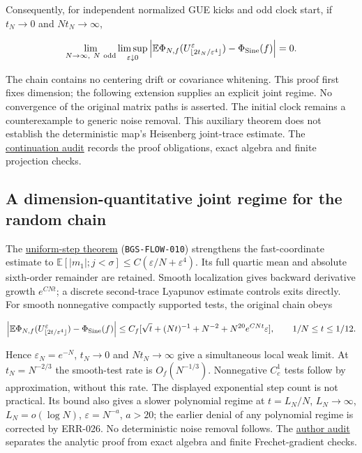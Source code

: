 Consequently, for independent normalized GUE kicks and odd clock start,
if \(t_N\to0\) and \(Nt_N\to\infty\),

\[
\lim_{N\to\infty,\ N\ {\rm odd}}\limsup_{\varepsilon\downarrow0}
\left|\mathbb E\Phi_{N,f}
 (U^\varepsilon_{\lfloor2t_N/\varepsilon^4\rfloor})
-\Phi_{\rm Sine}(f)\right|=0.
\]

The chain contains no centering drift or covariance whitening. This proof
first fixes dimension; the following extension supplies an explicit joint
regime. No convergence of the original matrix paths is asserted. The initial clock remains
a counterexample to generic noise removal. This auxiliary theorem does not
establish the deterministic map's Heisenberg joint-trace estimate. The
\href{https://github.com/ChurilovMaksim/BGS/blob/main/archive/record/coboundary_mobius_review_20260929.md}{continuation audit} records
the proof obligations, exact algebra and finite projection checks.

\hypertarget{a-dimension-quantitative-joint-regime-for-the-random-chain}{%
\subsection{A dimension-quantitative joint regime for the random chain}\label{a-dimension-quantitative-joint-regime-for-the-random-chain}}

The \href{https://github.com/ChurilovMaksim/BGS/blob/main/mathematics/coboundary_joint_limit.md}{uniform-step theorem} (\texttt{BGS-FLOW-010})
strengthens the fast-coordinate estimate to
\(\mathbb E[|m_1|;j<\sigma]\le C(\varepsilon/N+\varepsilon^4)\).
Its full quartic mean and absolute sixth-order remainder are retained.
Smooth localization gives backward derivative growth \(e^{CNt}\);
a discrete second-trace Lyapunov estimate controls exits directly.
For smooth nonnegative compactly supported tests, the original chain obeys

\[
\left|\mathbb E\Phi_{N,f}
 (U^\varepsilon_{\lfloor2t/\varepsilon^4\rfloor})
-\Phi_{\rm Sine}(f)\right|
\le C_f[\sqrt t+(Nt)^{-1}+N^{-2}+N^{20}e^{CNt}\varepsilon],
\qquad 1/N\le t\le1/12.
\]

Hence \(\varepsilon_N=e^{-N}\), \(t_N\to0\) and \(Nt_N\to\infty\) give
a simultaneous local weak limit. At \(t_N=N^{-2/3}\) the smooth-test rate
is \(O_f(N^{-1/3})\). Nonnegative \(C_c^1\) tests follow by approximation,
without this rate. The displayed exponential step count is not practical.
Its bound also gives a slower polynomial regime at \(t=L_N/N\),
\(L_N\to\infty\), \(L_N=o(\log N)\), \(\varepsilon=N^{-a}\), \(a>20\);
the earlier denial of any polynomial regime is corrected by ERR-026.
No deterministic noise removal follows. The
\href{https://github.com/ChurilovMaksim/BGS/blob/main/archive/record/coboundary_joint_review_20260930.md}{author audit} separates
the analytic proof from exact algebra and finite Frechet-gradient checks.


